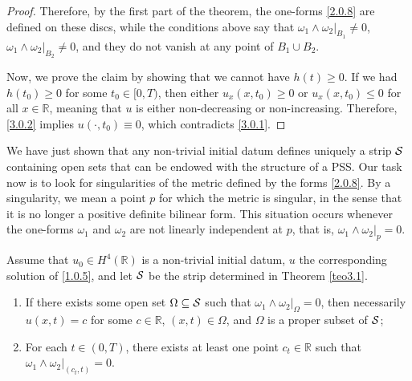 \documentclass{cimart}
\begin{document}
\begin{proof}
    Therefore, by the first part of the theorem, the one-forms \eqref{2.0.8} are defined on these discs, while the conditions above say that $\omega_1\wedge\omega_2\big|_{B_1}\neq0$, $\omega_1\wedge\omega_2\big|_{B_2}\neq0$, and they do not vanish at any point of $B_1\cup B_2$.

    Now, we prove the claim by showing that we cannot have $h(t)\geq0$. If we had $h(t_0)\geq0$ for some $t_0\in[0,T)$, then either $u_x(x,t_0)\geq0$ or $u_x(x,t_0)\leq0$ for all $x\in\mathbb{R}$, meaning that $u$ is either non-decreasing or non-increasing. Therefore, \eqref{3.0.2} implies $u(\cdot,t_0)\equiv0$, which contradicts \eqref{3.0.1}.
\end{proof}

We have just shown that any non-trivial initial datum defines uniquely a strip ${\cal S}$ containing open sets that can be endowed with the structure of a PSS. Our task now is to look for singularities of the metric defined by the forms \eqref{2.0.8}. By a singularity, we mean a point $p$ for which the metric is singular, in the sense that it is no longer a positive definite bilinear form. This situation occurs whenever the one-forms $\omega_1$ and $\omega_2$ are not linearly independent at $p$, that is, $\omega_1\wedge\omega_2\big|_p=0$.

\begin{theorem}\label{teo3.2} 
    Assume that $u_0\in H^4(\mathbb{R})$ is a non-trivial initial datum, $u$ the corresponding solution of \eqref{1.0.5}, and let ${\cal S}$ be the strip determined in Theorem \ref{teo3.1}.

    \begin{enumerate}
        \item If there exists some open set $\Omega\subseteq{\cal S}$ such that $\omega_1\wedge\omega_2\big|_\Omega=0$, then necessarily $u(x,t)=c$ for some $c\in\mathbb{R}$, $(x,t)\in\Omega$, and $\Omega$ is a proper subset of ${\cal S}$;
        \item For each $t\in(0,T)$, there exists at least one point $c_t\in\mathbb{R}$ such that $\omega_1\wedge\omega_2\big|_{(c_t,t)}=0$.
    \end{enumerate}
\end{theorem}
\end{document}
